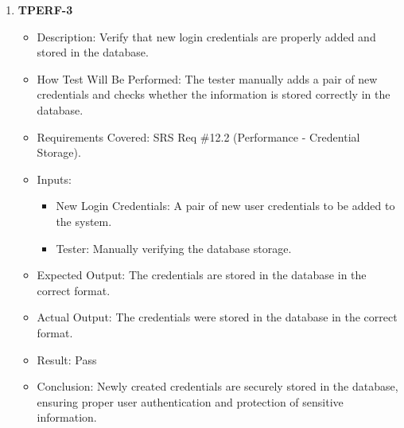 \documentclass[12pt, titlepage]{article}
\begin{document}
\begin{enumerate}
 \item \textbf{TPERF-3}  
    \begin{itemize}
        \item Description: Verify that new login credentials are properly added and stored in the database.
        \item How Test Will Be Performed: The tester manually adds a pair of new credentials and checks whether the information is stored correctly in the database.
        \item Requirements Covered: SRS Req \#12.2 (Performance - Credential Storage).
        \item Inputs:  
            \begin{itemize}
                \item New Login Credentials: A pair of new user credentials to be added to the system.
                \item Tester: Manually verifying the database storage.
            \end{itemize}
        \item Expected Output: The credentials are stored in the database in the correct format.
        \item Actual Output: The credentials were stored in the database in the correct format.
        \item Result: Pass
        \item Conclusion: Newly created credentials are securely stored in the database, ensuring proper user authentication and protection of sensitive information.
    \end{itemize}


\end{enumerate}
\end{document}

